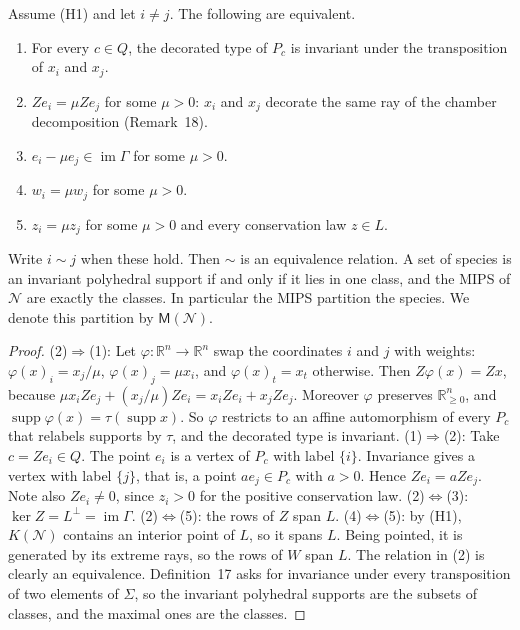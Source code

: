 \documentclass[11pt,a4paper]{report}
\providecommand{\R}{\mathbb{R}}
\newcommand{\Net}{\mathcal{N}}
\newcommand{\supp}{\operatorname{supp}}
\newcommand{\Mips}{\mathsf{M}}
\begin{document}
\begin{proposition}\label{prop:mips}
Assume (H1) and let \(i\neq j\). The following are equivalent.
\begin{enumerate}
\item For every \(c\in Q\), the decorated type of \(P_c\) is invariant under the transposition of \(x_i\) and \(x_j\).
\item \(Ze_i=\mu Ze_j\) for some \(\mu>0\): \(x_i\) and \(x_j\) decorate the same ray of the chamber decomposition
(Remark~18).
\item \(e_i-\mu e_j\in\operatorname{im}\Gamma\) for some \(\mu>0\).
\item \(w_i=\mu w_j\) for some \(\mu>0\).
\item \(z_i=\mu z_j\) for some \(\mu>0\) and every conservation law \(z\in L\).
\end{enumerate}
Write \(i\sim j\) when these hold. Then \(\sim\) is an equivalence relation. A set of species is an invariant polyhedral
support if and only if it lies in one class, and the MIPS of \(\Net\) are exactly the classes. In particular the MIPS
partition the species. We denote this partition by \(\Mips(\Net)\).
\end{proposition}
\begin{proof}
(2)\(\Rightarrow\)(1): Let \(\varphi\colon\R^n\to\R^n\) swap the coordinates \(i\) and \(j\) with weights:
\(\varphi(x)_i=x_j/\mu\), \(\varphi(x)_j=\mu x_i\), and \(\varphi(x)_t=x_t\) otherwise. Then
\(Z\varphi(x)=Zx\), because \(\mu x_iZe_j+(x_j/\mu)Ze_i=x_iZe_i+x_jZe_j\). Moreover \(\varphi\) preserves
\(\R^n_{\ge0}\), and \(\supp\varphi(x)=\tau(\supp x)\). So \(\varphi\) restricts to an affine automorphism of every
\(P_c\) that relabels supports by \(\tau\), and the decorated type is invariant.
(1)\(\Rightarrow\)(2): Take \(c=Ze_i\in Q\). The point \(e_i\) is a vertex of \(P_c\) with label \(\{i\}\). Invariance
gives a vertex with label \(\{j\}\), that is, a point \(ae_j\in P_c\) with \(a>0\). Hence \(Ze_i=aZe_j\). Note also
\(Ze_i\neq0\), since \(z_i>0\) for the positive conservation law.
(2)\(\Leftrightarrow\)(3): \(\ker Z=L^{\perp}=\operatorname{im}\Gamma\).
(2)\(\Leftrightarrow\)(5): the rows of \(Z\) span \(L\).
(4)\(\Leftrightarrow\)(5): by (H1), \(K(\Net)\) contains an interior point of \(L\), so it spans \(L\). Being pointed,
it is generated by its extreme rays, so the rows of \(W\) span \(L\).
The relation in (2) is clearly an equivalence. Definition~17 asks for invariance under every transposition of two
elements of \(\Sigma\), so the invariant polyhedral supports are the subsets of classes, and the maximal ones are the
classes.
\end{proof}
\end{document}
